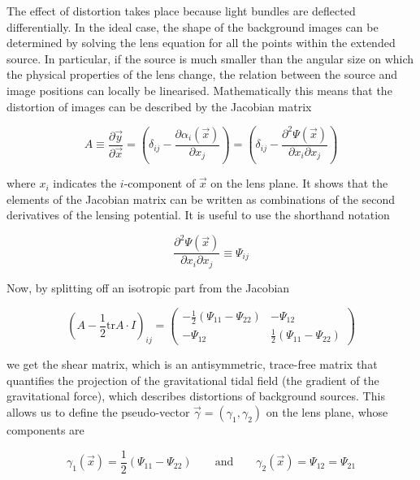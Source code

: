The effect of distortion takes place because light bundles are deflected differentially. In the ideal case, the shape of the background images can be determined by solving the lens equation for all the points within the extended source. In particular, if the source is much smaller than the angular size on which the physical properties of the lens change, the relation between the source and image positions can locally be linearised. Mathematically this means that the distortion of images can be described by the Jacobian matrix

\begin{equation}
A\equiv\frac{\partial\vec{y}}{\partial\vec{x}}=\left(\delta_{ij}-\frac{\partial\alpha_{i}(\vec{x})}{\partial x_{j}}\right)=\left(\delta_{ij}-\frac{\partial^{2}\Psi(\vec{x})}{\partial x_{i}\partial x_{j}}\right)
\end{equation}

where $x_i$ indicates the $i$-component of $\vec{x}$ on the lens plane. It shows that the elements of the Jacobian matrix can be written as combinations of the second derivatives of the lensing potential. It is useful to use the shorthand notation

\begin{equation}
\frac{\partial^{2}\Psi(\vec{x})}{\partial x_{i}\partial x_{j}}\equiv\Psi_{ij}
\end{equation}

Now, by splitting off an isotropic part from the Jacobian

\begin{equation}
\left(A-\frac{1}{2}\text{tr}A\cdot I\right)_{ij}=\left(\begin{array}{cc}
-\frac{1}{2}\left(\Psi_{11}-\Psi_{22}\right) & -\Psi_{12}\\
-\Psi_{12} & \frac{1}{2}\left(\Psi_{11}-\Psi_{22}\right)
\end{array}\right)
\end{equation}

we get the shear matrix, which is an antisymmetric, trace-free matrix that quantifies the projection of the gravitational tidal field (the gradient of the gravitational force), which describes distortions of background sources.  This allows us to define the pseudo-vector $\vec{\gamma}=(\gamma_1 , \gamma_2)$ on the lens plane, whose components are

\begin{equation}
\gamma_1(\vec{x})=\frac{1}{2}(\Psi_{11}-\Psi_{22})\qquad \text{and} \qquad \gamma_2(\vec{x})=\Psi_{12} = \Psi_{21}
\end{equation}

